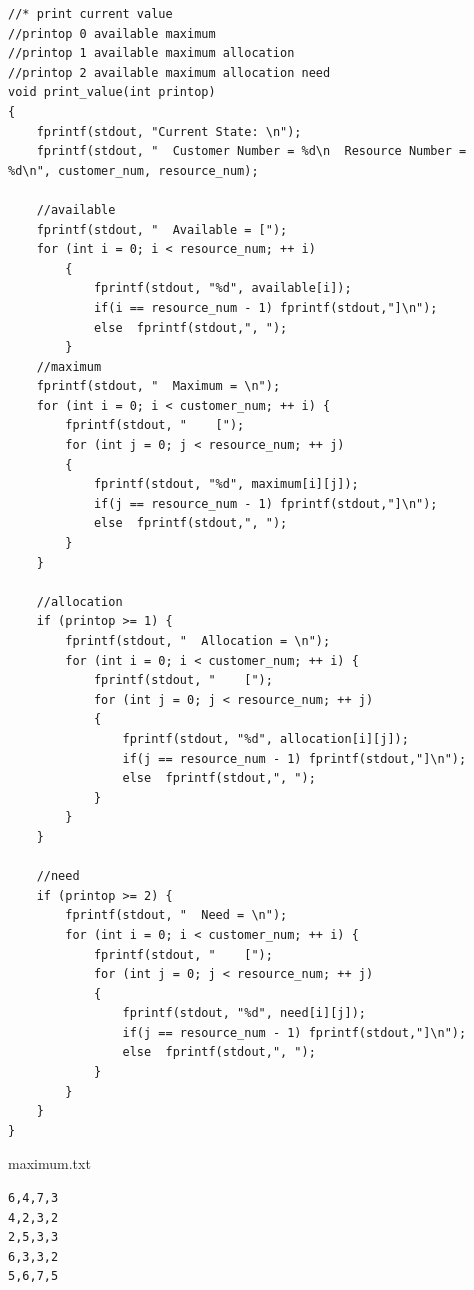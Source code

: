 \documentclass{article}
\begin{document}
\begin{lstlisting}[language={[ANSI]C}]
//* print current value
//printop 0 available maximum
//printop 1 available maximum allocation
//printop 2 available maximum allocation need
void print_value(int printop)
{
	fprintf(stdout, "Current State: \n");
	fprintf(stdout, "  Customer Number = %d\n  Resource Number = %d\n", customer_num, resource_num);
	
	//available
	fprintf(stdout, "  Available = [");
	for (int i = 0; i < resource_num; ++ i)
		{
			fprintf(stdout, "%d", available[i]);
			if(i == resource_num - 1) fprintf(stdout,"]\n");
			else  fprintf(stdout,", ");
		}
	//maximum
	fprintf(stdout, "  Maximum = \n");
	for (int i = 0; i < customer_num; ++ i) {
		fprintf(stdout, "    [");
		for (int j = 0; j < resource_num; ++ j)
		{
			fprintf(stdout, "%d", maximum[i][j]);
			if(j == resource_num - 1) fprintf(stdout,"]\n");
			else  fprintf(stdout,", ");
		}
	}

	//allocation
	if (printop >= 1) {
		fprintf(stdout, "  Allocation = \n");
		for (int i = 0; i < customer_num; ++ i) {
			fprintf(stdout, "    [");
			for (int j = 0; j < resource_num; ++ j)
			{
				fprintf(stdout, "%d", allocation[i][j]);
				if(j == resource_num - 1) fprintf(stdout,"]\n");
				else  fprintf(stdout,", ");
			}
		}
	}
	
	//need
	if (printop >= 2) {
		fprintf(stdout, "  Need = \n");
		for (int i = 0; i < customer_num; ++ i) {
			fprintf(stdout, "    [");
			for (int j = 0; j < resource_num; ++ j)
			{
				fprintf(stdout, "%d", need[i][j]);
				if(j == resource_num - 1) fprintf(stdout,"]\n");
				else  fprintf(stdout,", ");
			}
		}
	}
}
\end{lstlisting}
\begin{center}
{\ttfamily maximum.txt}
\end{center}
\begin{lstlisting}[language={[ANSI]C}]
6,4,7,3
4,2,3,2
2,5,3,3
6,3,3,2
5,6,7,5
\end{lstlisting}
\end{document}
